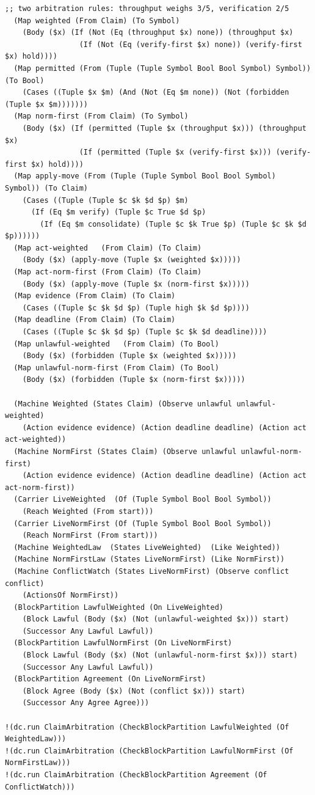 \documentclass[11pt]{article}
\theoremstyle{definition}
\theoremstyle{plain}
\begin{document}
\begin{lstlisting}[style=mettamod]
  ;; two arbitration rules: throughput weighs 3/5, verification 2/5
  (Map weighted (From Claim) (To Symbol)
    (Body ($x) (If (Not (Eq (throughput $x) none)) (throughput $x)
                 (If (Not (Eq (verify-first $x) none)) (verify-first $x) hold))))
  (Map permitted (From (Tuple (Tuple Symbol Bool Bool Symbol) Symbol)) (To Bool)
    (Cases ((Tuple $x $m) (And (Not (Eq $m none)) (Not (forbidden (Tuple $x $m)))))))
  (Map norm-first (From Claim) (To Symbol)
    (Body ($x) (If (permitted (Tuple $x (throughput $x))) (throughput $x)
                 (If (permitted (Tuple $x (verify-first $x))) (verify-first $x) hold))))
  (Map apply-move (From (Tuple (Tuple Symbol Bool Bool Symbol) Symbol)) (To Claim)
    (Cases ((Tuple (Tuple $c $k $d $p) $m)
      (If (Eq $m verify) (Tuple $c True $d $p)
        (If (Eq $m consolidate) (Tuple $c $k True $p) (Tuple $c $k $d $p))))))
  (Map act-weighted   (From Claim) (To Claim)
    (Body ($x) (apply-move (Tuple $x (weighted $x)))))
  (Map act-norm-first (From Claim) (To Claim)
    (Body ($x) (apply-move (Tuple $x (norm-first $x)))))
  (Map evidence (From Claim) (To Claim)
    (Cases ((Tuple $c $k $d $p) (Tuple high $k $d $p))))
  (Map deadline (From Claim) (To Claim)
    (Cases ((Tuple $c $k $d $p) (Tuple $c $k $d deadline))))
  (Map unlawful-weighted   (From Claim) (To Bool)
    (Body ($x) (forbidden (Tuple $x (weighted $x)))))
  (Map unlawful-norm-first (From Claim) (To Bool)
    (Body ($x) (forbidden (Tuple $x (norm-first $x)))))

  (Machine Weighted (States Claim) (Observe unlawful unlawful-weighted)
    (Action evidence evidence) (Action deadline deadline) (Action act act-weighted))
  (Machine NormFirst (States Claim) (Observe unlawful unlawful-norm-first)
    (Action evidence evidence) (Action deadline deadline) (Action act act-norm-first))
  (Carrier LiveWeighted  (Of (Tuple Symbol Bool Bool Symbol))
    (Reach Weighted (From start)))
  (Carrier LiveNormFirst (Of (Tuple Symbol Bool Bool Symbol))
    (Reach NormFirst (From start)))
  (Machine WeightedLaw  (States LiveWeighted)  (Like Weighted))
  (Machine NormFirstLaw (States LiveNormFirst) (Like NormFirst))
  (Machine ConflictWatch (States LiveNormFirst) (Observe conflict conflict)
    (ActionsOf NormFirst))
  (BlockPartition LawfulWeighted (On LiveWeighted)
    (Block Lawful (Body ($x) (Not (unlawful-weighted $x))) start)
    (Successor Any Lawful Lawful))
  (BlockPartition LawfulNormFirst (On LiveNormFirst)
    (Block Lawful (Body ($x) (Not (unlawful-norm-first $x))) start)
    (Successor Any Lawful Lawful))
  (BlockPartition Agreement (On LiveNormFirst)
    (Block Agree (Body ($x) (Not (conflict $x))) start)
    (Successor Any Agree Agree)))

!(dc.run ClaimArbitration (CheckBlockPartition LawfulWeighted (Of WeightedLaw)))
!(dc.run ClaimArbitration (CheckBlockPartition LawfulNormFirst (Of NormFirstLaw)))
!(dc.run ClaimArbitration (CheckBlockPartition Agreement (Of ConflictWatch)))
\end{lstlisting}
\end{document}
